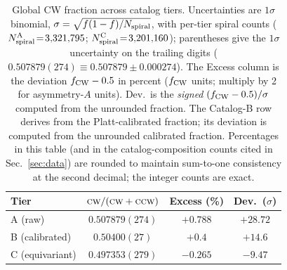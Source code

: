 \documentclass[aps,prd,twocolumn,superscriptaddress,preprintnumbers,nofootinbib,longbibliography,floatfix]{revtex4-2}
\newcommand{\CW}{\textsc{cw}}
\newcommand{\CCW}{\textsc{ccw}}
\newcommand{\sigmaunit}{\sigma}
\begin{document}
\begin{table}[tbp]
\caption{Global CW fraction across catalog tiers. Uncertainties are $1\sigmaunit$ binomial, $\sigma=\sqrt{f(1-f)/N_{\rm spiral}}$, with per-tier spiral counts ($N_{\rm spiral}^{\rm A}\!=\!3{,}321{,}795$; $N_{\rm spiral}^{\rm C}\!=\!3{,}201{,}160$); parentheses give the $1\sigmaunit$ uncertainty on the trailing digits ($0.507879(274)\equiv0.507879\pm0.000274$). The Excess column is the deviation $f_{\rm CW}-0.5$ in percent ($f_{\rm CW}$ units; multiply by 2 for asymmetry-$A$ units). Dev.\ is the \emph{signed} $(f_{\rm CW}-0.5)/\sigma$ computed from the unrounded fraction. The Catalog-B row derives from the Platt-calibrated fraction; its deviation is computed from the unrounded calibrated fraction. Percentages in this table (and in the catalog-composition counts cited in Sec.~\ref{sec:data}) are rounded to maintain sum-to-one consistency at the second decimal; the integer counts are exact. \label{tab:cw_frac}}
\begin{ruledtabular}
\begin{tabular}{lccc}
\textbf{Tier} & \textbf{$\CW/(\CW+\CCW)$} & \textbf{Excess (\%)} & \textbf{Dev.\ ($\sigmaunit$)} \\
\hline
A (raw) & $0.507879(274)$ & $+0.788$ & $+28.72$ \\
B (calibrated) & $0.50400(27)$ & $+0.4$ & $+14.6$ \\
C (equivariant) & $0.497353(279)$ & $-0.265$ & $-9.47$ \\
\end{tabular}
\end{ruledtabular}
\end{table}
\end{document}
